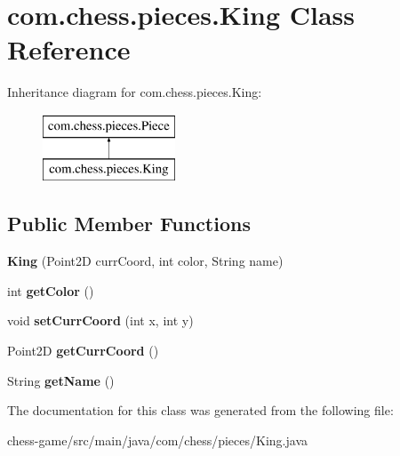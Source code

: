 \hypertarget{classcom_1_1chess_1_1pieces_1_1_king}{}\section{com.\+chess.\+pieces.\+King Class Reference}
\label{classcom_1_1chess_1_1pieces_1_1_king}
Inheritance diagram for com.\+chess.\+pieces.\+King\+:\begin{figure}[H]
\begin{center}
\leavevmode
\includegraphics[height=2.000000cm]{classcom_1_1chess_1_1pieces_1_1_king}
\end{center}
\end{figure}
\subsection*{Public Member Functions}
\begin{DoxyCompactItemize}
\item 
\mbox{\label{classcom_1_1chess_1_1pieces_1_1_king_a0a57306bddb70f7d047139da50dbc88a}} 
{\bfseries King} (Point2D curr\+Coord, int color, String name)
\item 
\mbox{\label{classcom_1_1chess_1_1pieces_1_1_king_a4f386b380fbfb0f7f68e2c45de157d68}} 
int {\bfseries get\+Color} ()
\item 
\mbox{\label{classcom_1_1chess_1_1pieces_1_1_king_a53e1cac061b2153f201c2bbc918e60de}} 
void {\bfseries set\+Curr\+Coord} (int x, int y)
\item 
\mbox{\label{classcom_1_1chess_1_1pieces_1_1_king_a9f2bbc92c4623adcfce07e702a6aed23}} 
Point2D {\bfseries get\+Curr\+Coord} ()
\item 
\mbox{\label{classcom_1_1chess_1_1pieces_1_1_king_afe8cdbea55d1fa8b944e39685dc9ad85}} 
String {\bfseries get\+Name} ()
\end{DoxyCompactItemize}


The documentation for this class was generated from the following file\+:\begin{DoxyCompactItemize}
\item 
chess-\/game/src/main/java/com/chess/pieces/King.\+java\end{DoxyCompactItemize}
